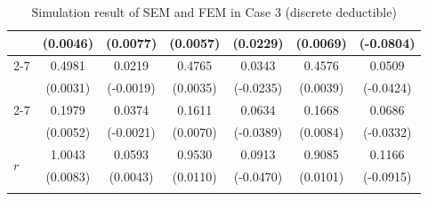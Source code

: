 \begin{table}[!ht]
{{\begin{minipage}{0.65\textwidth}
\begin{tabular}{lcccccc}
         & (0.0046) & (0.0077) & (0.0057) & (0.0229) & (0.0069) & (-0.0804) \\
        \cmidrule{2-7}
         & 0.4981 & 0.0219 & 0.4765 & 0.0343 & 0.4576 & 0.0509 \\
         & (0.0031) & (-0.0019) & (0.0035) & (-0.0235) & (0.0039) & (-0.0424) \\
        \cmidrule{2-7}
         & 0.1979 & 0.0374 & 0.1611 & 0.0634 & 0.1668 & 0.0686 \\
         & (0.0052) & (-0.0021) & (0.0070) & (-0.0389) & (0.0084) & (-0.0332) \\
        \midrule
        \multirow{2}{*}{$r$} & 1.0043 & 0.0593 & 0.9530 & 0.0913 & 0.9085 & 0.1166 \\
         & (0.0083) & (0.0043) & (0.0110) & (-0.0470) & (0.0101) & (-0.0915) \\
        \hhline{=======}
        \end{tabular}
    \end{minipage}
}
}
\caption{Simulation result of SEM and FEM in Case 3 (discrete deductible)}\label{tab:AppSimExoCase3}
\end{table}
